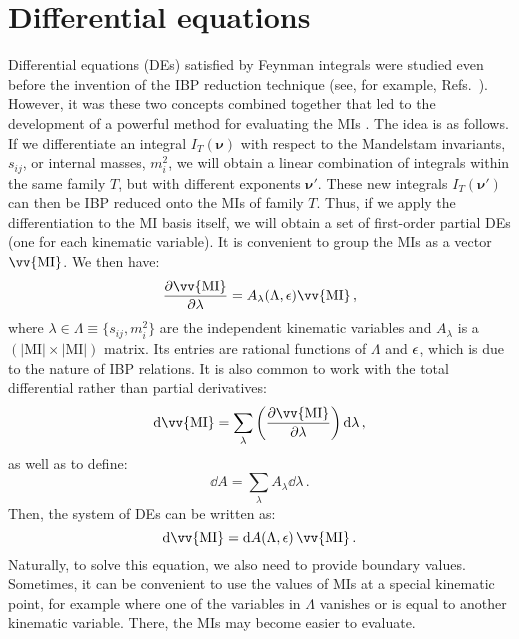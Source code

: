 \documentclass[main.tex]{subfiles}
\begin{document}
\section{Differential equations} \label{sec:DEs}
Differential equations (DEs) satisfied by Feynman integrals were studied even before the invention of the IBP reduction technique (see, for example, Refs.~\cite{Barucchi:1973zm, Golubeva:1976}). However, it was these two concepts combined together that led to the development of a powerful method for evaluating the MIs \cite{Kotikov:1990kg, Kotikov:1991314, Bern:1993kr, Remiddi:1997ny, Gehrmann:1999as}. The idea is as follows. If we differentiate an integral $I_T(\bm{\nu})$ with respect to the Mandelstam invariants, $s_{ij}$, or internal masses, $m_i^2$, we will obtain a linear combination of integrals within the same family $T$, but with different exponents $\bm{\nu}'$. These new integrals $I_T(\bm{\nu}')$ can then be IBP reduced onto the MIs of family $T$. Thus, if we apply the differentiation to the MI basis itself, we will obtain a set of first-order partial DEs (one for each kinematic variable). It is convenient to group the MIs as a vector $\vv{\text{MI}}$. We then have:
\begin{equation} \label{eq:DEspartial}
    \frac{\partial \vv{\text{MI}}}{\partial \lambda} = A_{\lambda}(\Lambda, \eps) \vv{\text{MI}}\,,
\end{equation}
where $\lambda \in \Lambda \equiv \{s_{ij}, m_i^2\}$ are the independent kinematic variables and $A_\lambda$ is a $\left(|\text{MI}| \times |\text{MI}|\right)$ matrix. Its entries are rational functions of $\Lambda$ and $\epsilon$, which is due to the nature of IBP relations. It is also common to work with the total differential rather than partial derivatives:
\begin{equation}
    \dd \vv{\text{MI}} = \sum_{\lambda} \left(\frac{\partial \vv{\text{MI}}}{\partial \lambda} \right) \dd \lambda\,,
\end{equation}
as well as to define:
\begin{equation}
    \dd A = \sum_\lambda A_\lambda \dd\lambda\,.
\end{equation}
Then, the system of DEs can be written as:
\begin{equation} \label{eq:DEsoneform}
    \dd \vv{\text{MI}} = \dd A(\Lambda, \eps) \,\vv{\text{MI}}\,.
\end{equation}
Naturally, to solve this equation, we also need to provide boundary values. Sometimes, it can be convenient to use the values of MIs at a special kinematic point, for example where one of the variables in $\Lambda$ vanishes or is equal to another kinematic variable. There, the MIs may become easier to evaluate. 
\end{document}
